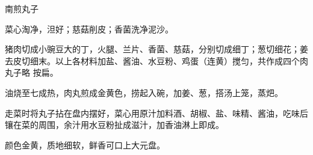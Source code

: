 \begin{recipe}{南煎丸子}

\ingredients


\preparation

\step 菜心淘净，泹好；慈菇削皮；香菌洗净泥沙。

\step 猪肉切成小豌豆大的丁，火腿、兰片、香菌、慈菇，分别切成细丁；葱切细花；姜
去皮切细末。以上各材料加盐、酱油、水豆粉、鸡蛋（连黄）搅匀，共作成四个肉丸子略
按扁。

\step 油烧至七成热，肉丸煎成金黄色，捞起入碗，加姜、葱，搭汤上笼，蒸𤆵。

\step 走菜时将丸子拈在盘内摆好，菜心用原汁加料酒、胡椒、盐、味精、酱油，吃味后
镶在菜的周围，余汁用水豆粉扯成滋汁，加香油淋上即成。

\features

颜色金黄，质地细软，鲜香可口上大元盘。

\end{recipe}

